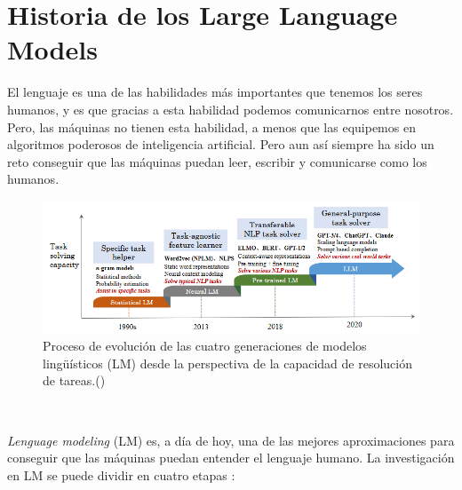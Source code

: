 \section{Historia de los Large Language Models}
\label{sec:historia}


El lenguaje es una de las habilidades más importantes que tenemos los seres humanos, y es
que gracias a esta habilidad podemos comunicarnos entre nosotros. Pero, las máquinas no
tienen esta habilidad, a menos que las equipemos en algoritmos poderosos de inteligencia
artificial. Pero aun así siempre ha sido un reto conseguir que las máquinas puedan leer,
escribir y comunicarse como los humanos.

\begin{figure}[H]
    \begin{center}
      \includegraphics[width=15cm]{figuras/Capitulo_03/EvolutionLM.png}
    \end{center}
    \caption[Proceso de evolución de las cuatro generaciones de modelos lingüísticos (LM) desde la perspectiva de la capacidad de resolución de tareas.]{Proceso de evolución de las cuatro generaciones de modelos lingüísticos (LM) desde la perspectiva de la capacidad de resolución de tareas.(\cite{ZhaoWayneXin2023ASoL})}
    \label{fig:evolutionLM}
\end{figure}\

\textit{Lenguage modeling} (LM) es, a día de hoy, una de las mejores aproximaciones para conseguir
que las máquinas puedan entender el lenguaje humano. La investigación en LM se puede dividir
en cuatro etapas \cite{ZhaoWayneXin2023ASoL}:


